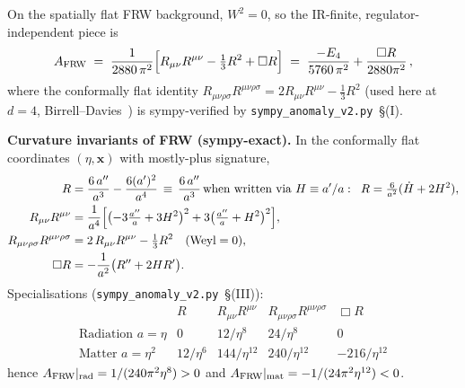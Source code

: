 \documentclass[11pt]{article}
\begin{document}
On the spatially flat FRW background, $W^2=0$, so the IR-finite,
regulator-independent piece is
\begin{equation}
   A_{\rm FRW}
   \;=\; \frac{1}{2880\,\pi^2}
        \Bigl[R_{\mu\nu}R^{\mu\nu}-\tfrac13R^2+\Box R\Bigr]
        \;=\; \frac{-E_4}{5760\,\pi^2}+\frac{\Box R}{2880\pi^2}\,,
   \label{eq:A-FRW}
\end{equation}
where the conformally flat identity $R_{\mu\nu\rho\sigma}R^{\mu\nu\rho\sigma}=2R_{\mu\nu}R^{\mu\nu}-\frac13R^2$
(used here at $d=4$, Birrell--Davies~\cite[eq.~(6.123)]{BirrellDavies})
is sympy-verified by \texttt{sympy\_anomaly\_v2.py}~\S(I).

\smallskip
\noindent\textbf{Curvature invariants of FRW (sympy-exact).}
In the conformally flat coordinates $(η,\mathbf{x})$ with mostly-plus
signature,
\begin{align*}
   R&=\frac{6\,a''}{a^3}-\frac{6(a')^2}{a^4}\,\equiv\,\frac{6\,a''}{a^3}\,
       \text{when written via }H\equiv a'/a:\;\;R=\tfrac{6}{a^2}(\dot H+2H^2),\\
   R_{\mu\nu}R^{\mu\nu}&=\frac{1}{a^4}\Bigl[\bigl(-3\tfrac{a''}{a}+3H^2\bigr)^2
        +3\bigl(\tfrac{a''}{a}+H^2\bigr)^2\Bigr],\\
   R_{\mu\nu\rho\sigma}R^{\mu\nu\rho\sigma}
        &=2\,R_{\mu\nu}R^{\mu\nu}-\tfrac13R^2\quad(\text{Weyl}=0),\\
   \Box R&=-\frac{1}{a^2}\bigl(R''+2HR'\bigr).
\end{align*}
Specialisations (\texttt{sympy\_anomaly\_v2.py}~\S(III)):
\begin{equation}
\begin{array}{l|cccc}
& R & R_{\mu\nu}R^{\mu\nu} & R_{\mu\nu\rho\sigma}R^{\mu\nu\rho\sigma}
& \Box R\\\hline
\text{Radiation }a=\eta &
0 & 12/\eta^{8} & 24/\eta^{8} & 0\\
\text{Matter }a=\eta^{2} &
12/\eta^{6} & 144/\eta^{12} & 240/\eta^{12} & -216/\eta^{12}
\end{array}
\label{eq:curv-table}
\end{equation}
hence $A_{\rm FRW}|_{\rm rad}=1/(240\pi^2\eta^8)>0$ and
$A_{\rm FRW}|_{\rm mat}=-1/(24\pi^2\eta^{12})<0$.
\end{document}
